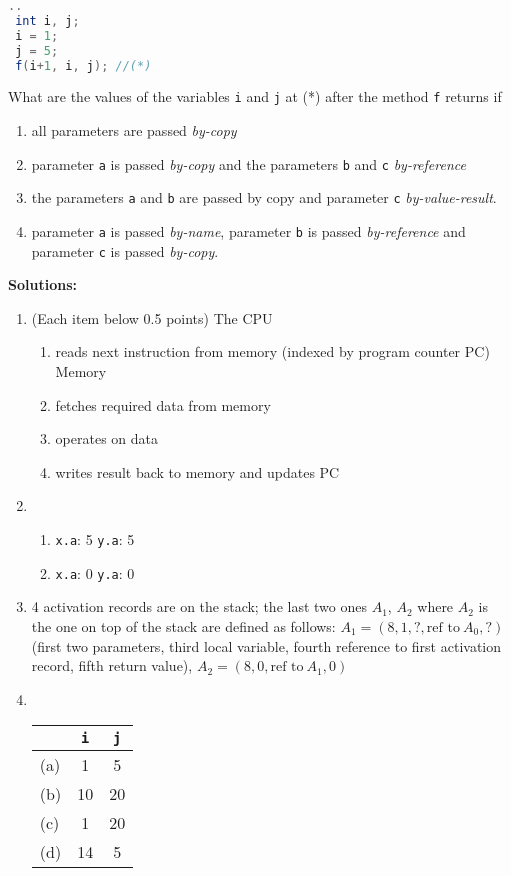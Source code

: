 \documentclass{article}
\newcommand{\solution}[1] {\textbf{Solutions:}\\ #1}
\begin{document}
\begin{enumerate}
\begin{lstlisting}[language=Java, columns=flexible]
 ..
 int i, j;
 i = 1; 
 j = 5;
 f(i+1, i, j); //(*)
\end{lstlisting}

What are the values of the variables \lstinline!i! and \lstinline!j!
at (*) after the method \lstinline!f! returns if
\begin{enumerate}
  \item all parameters are passed \emph{by-copy}
  \item parameter \lstinline!a! is passed \emph{by-copy} and
    the parameters \lstinline!b! and \lstinline!c! \emph{by-reference}
  \item the parameters \lstinline!a! and \lstinline!b! are passed by
    copy and parameter \lstinline!c! \emph{by-value-result}. 
  \item parameter \lstinline!a! is passed \emph{by-name}, parameter
    \lstinline!b! is passed \emph{by-reference} and parameter
    \lstinline!c! is passed \emph{by-copy}.
\end{enumerate} 
\end{enumerate}

\solution{
\begin{enumerate}
\item (Each item below 0.5 points) The CPU 
  \begin{enumerate}
  \item  reads next instruction from memory (indexed by program counter PC)
    Memory
  \item fetches required data from memory
  \item operates on data
  \item writes result back to memory and updates PC
  \end{enumerate}
\item
  \begin{enumerate}   
  \item \lstinline!x.a!: 5 \quad  \lstinline!y.a!: 5
  \item \lstinline!x.a!: 0  \quad \lstinline!y.a!: 0
  \end{enumerate}
\item 4 activation records are on the stack; the last two ones
  $A_1$, $A_2$ where $A_2$ is the one on top of the stack are defined
  as follows: $A_1=(8,1,?,\text{ref to}~A_{0} , ?)$ (first two parameters,
  third local variable, fourth reference to first activation record,
  fifth return value), $A_2=(8,0, \text{ref to}~A_1, 0)$  
\item\hfill\\
  \begin{tabular}{lcc}
    & \lstinline!i! & \lstinline!j! \\ \hline
   (a) &  1 & 5 \\
   (b) & 10 & 20 \\
   (c) & 1 & 20 \\
   (d) & 14 & 5 \\
  \end{tabular}

  
\end{enumerate}
}
\end{document}
